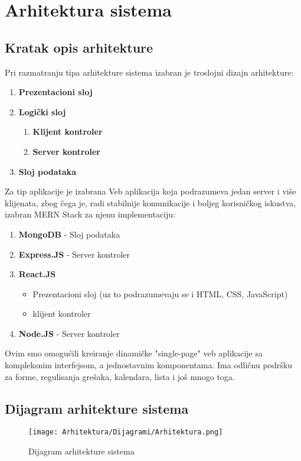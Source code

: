 \documentclass{article}
\begin{document}
\section{Arhitektura sistema}
\subsection{Kratak opis arhitekture}
Pri razmatranju tipa arhitekture sistema izabran je troslojni dizajn arhitekture:
\begin{enumerate}
    \item \textbf{Prezentacioni sloj}
    \item \textbf{Logički sloj}
    \begin{enumerate}
        \item\textbf{Klijent kontroler}
        \item\textbf{Server kontroler}
    \end{enumerate}
    \item \textbf{Sloj podataka}
\end{enumerate}

Za tip aplikacije je izabrana Veb aplikacija koja podrazumeva jedan server i više klijenata, zbog čega je, radi stabilnije komunikacije i boljeg korisničkog iskustva, izabran MERN Stack za njenu implementaciju: 
\begin{enumerate}
    \item \textbf{MongoDB} - Sloj podataka
    \item \textbf{Express.JS} - Server kontroler
    \item \textbf{React.JS}\begin{itemize}
        \item Prezentacioni sloj (uz to podrazumevaju se i HTML, CSS, JavaScript)
        \item klijent kontroler
    \end{itemize} 
    \item \textbf{Node.JS} - Server kontroler

\end{enumerate}
Ovim smo omogućili kreiranje dinamičke "single-page" veb aplikacije sa kompleksnim interfejsom, a jednostavnim komponentama. Ima odličnu podršku za forme, regulisanja grešaka, kalendara, lista i još mnogo toga. 

\newpage
\subsection{Dijagram arhitekture sistema}
\begin{figure}[!ht]
        \begin{center}
            \texttt{[image: Arhitektura/Dijagrami/Arhitektura.png]}
        \end{center}
    \caption{Dijagram arhitekture sistema}
    \end{figure}
\end{document}
